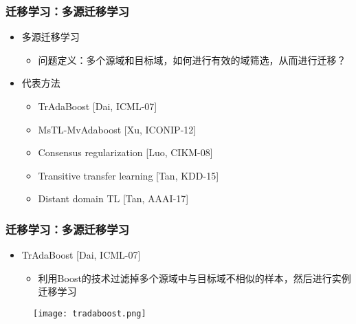 
\begin{frame}
    \frametitle{迁移学习：多源迁移学习}
    \begin{itemize}
        \item 多源迁移学习
            \begin{itemize}
                \item 问题定义：多个源域和目标域，如何进行有效的域筛选，从而进行迁移？
            \end{itemize}
        \item 代表方法
            \begin{itemize}
                \item TrAdaBoost [Dai, ICML-07]
                \item MsTL-MvAdaboost [Xu, ICONIP-12]
                \item Consensus regularization [Luo, CIKM-08]
                \item Transitive transfer learning [Tan, KDD-15]
                \item Distant domain TL [Tan, AAAI-17]
            \end{itemize}
    \end{itemize}
\end{frame}

\begin{frame}
    \frametitle{迁移学习：多源迁移学习}
    \begin{itemize}
        \item TrAdaBoost [Dai, ICML-07]
            \begin{itemize}
                \item 利用Boost的技术过滤掉多个源域中与目标域不相似的样本，然后进行实例迁移学习
            \end{itemize}
    \end{itemize}
    \begin{figure}
        \texttt{[image: tradaboost.png]}
    \end{figure}
\end{frame}

